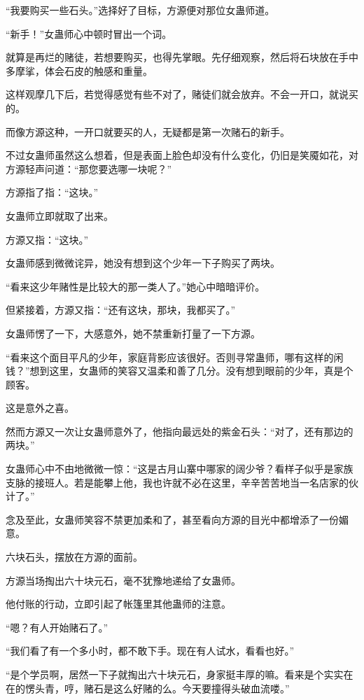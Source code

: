 
\begin{this_body}

“我要购买一些石头。”选择好了目标，方源便对那位女蛊师道。

“新手！”女蛊师心中顿时冒出一个词。

就算是再烂的赌徒，若想要购买，也得先掌眼。先仔细观察，然后将石块放在手中多摩挲，体会石皮的触感和重量。

这样观摩几下后，若觉得感觉有些不对了，赌徒们就会放弃。不会一开口，就说买的。

而像方源这种，一开口就要买的人，无疑都是第一次赌石的新手。

不过女蛊师虽然这么想着，但是表面上脸色却没有什么变化，仍旧是笑魇如花，对方源轻声问道：“那您要选哪一块呢？”

方源指了指：“这块。”

女蛊师立即就取了出来。

方源又指：“这块。”

女蛊师感到微微诧异，她没有想到这个少年一下子购买了两块。

“看来这少年赌性是比较大的那一类人了。”她心中暗暗评价。

但紧接着，方源又指：“还有这块，那块，我都买了。”

女蛊师愣了一下，大感意外，她不禁重新打量了一下方源。

“看来这个面目平凡的少年，家庭背影应该很好。否则寻常蛊师，哪有这样的闲钱？”想到这里，女蛊师的笑容又温柔和善了几分。没有想到眼前的少年，真是个顾客。

这是意外之喜。

然而方源又一次让女蛊师意外了，他指向最远处的紫金石头：“对了，还有那边的两块。”

女蛊师心中不由地微微一惊：“这是古月山寨中哪家的阔少爷？看样子似乎是家族支脉的接班人。若是能攀上他，我也许就不必在这里，辛辛苦苦地当一名店家的伙计了。”

念及至此，女蛊师笑容不禁更加柔和了，甚至看向方源的目光中都增添了一份媚意。

六块石头，摆放在方源的面前。

方源当场掏出六十块元石，毫不犹豫地递给了女蛊师。

他付账的行动，立即引起了帐篷里其他蛊师的注意。

“嗯？有人开始赌石了。”

“我们看了有一个多小时，都不敢下手。现在有人试水，看看也好。”

“是个学员啊，居然一下子就掏出六十块元石，身家挺丰厚的嘛。看来是个实实在在的愣头青，哼，赌石是这么好赌的么。今天要撞得头破血流喽。”


\end{this_body}
